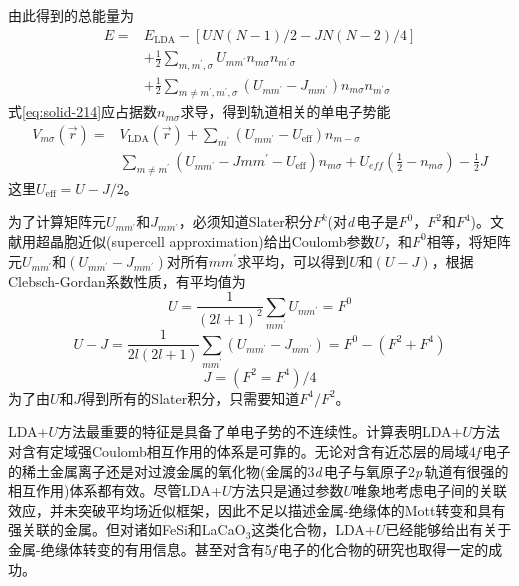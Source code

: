 由此得到的总能量为
\begin{equation}
  \begin{split}
	  E=&E_{\mathrm{LDA}}-[UN(N-1)/2-JN(N-2)/4]\\
  &+\frac12\sum_{m,m^{\prime},\sigma}U_{mm^{\prime}}n_{m\sigma}n_{m^{\prime}\sigma}\\
  &+\frac12\sum_{m\neq m^{\prime},m^{\prime},\sigma}(U_{mm^{\prime}}-J_{mm^{\prime}})n_{m\sigma}n_{m^{\prime}\sigma}
  \end{split}
  \label{eq:solid-214}
\end{equation}
式\eqref{eq:solid-214}应占据数$n_{m\sigma}$求导，得到轨道相关的单电子势能
\begin{equation}
  \begin{split}
	  V_{m\sigma}(\vec r)=&V_{\mathrm{LDA}}(\vec r)+\sum_{m^{\prime}}(U_{mm^{\prime}}-U_{\mathrm{eff}})n_{m-\sigma}\\
	  &\sum_{m\neq m^{\prime}}(U_{mm^{\prime}}-J{mm^{\prime}}-U_{\mathrm{eff}})n_{m\sigma}+U_{eff}\left(\frac12-n_{m\sigma}\right)-\frac12J
  \end{split}
  \label{eq:solid-215}
\end{equation}
这里$U_{\mathrm{eff}}=U-J/2$。

为了计算矩阵元$U_{mm^{\prime}}$和$J_{mm^{\prime}}$，必须知道Slater积分$F^k$(对{\it d}\,电子是$F^0$，$F^2$和$F^4$)。文献\cite{PRB43-7570_1991}用超晶胞近似(supercell approximation)给出Coulomb参数$U$，和$F^0$相等，将矩阵元$U_{mm^{\prime}}$和$(U_{mm^{\prime}}-J_{mm^{\prime}})$对所有$mm^{\prime}$求平均，可以得到$U$和$(U-J)$，根据Clebsch-Gordan系数性质，有平均值为
\begin{equation}
  U=\frac1{(2l+1)^2}\sum_{mm^{\prime}}U_{mm^{\prime}}=F^0
  \label{eq:solid-216}
\end{equation}
\begin{equation}
  U-J=\frac1{2l(2l+1)}\sum_{mm^{\prime}}(U_{mm^{\prime}}-J_{mm^{\prime}})=F^0-(F^2+F^4)
  \label{eq:solid-217}
\end{equation}
\begin{equation}
  J=(F^2=F^4)/4
  \label{eq:solid-218}
\end{equation}
为了由$U$和$J$得到所有的Slater积分，只需要知道$F^4/F^2$\cite{PRB42-5459_1990}。

LDA+$U$方法最重要的特征是具备了单电子势的不连续性。计算表明LDA+$U$方法对含有定域强Coulomb相互作用的体系是可靠的\cite{PRB48-16929_1993,JPCS56-1521_1995,EPL36-551_1996}。无论对含有近芯层的局域4{\textit f}\,电子的稀土金属离子还是对过渡金属的氧化物(金属的3{\textit d}\,电子与氧原子2{\textit p}\,轨道有很强的相互作用)体系都有效。尽管LDA+$U$方法只是通过参数$U$唯象地考虑电子间的关联效应，并未突破平均场近似框架，因此不足以描述金属-绝缘体的\textrm{Mott}转变和具有强关联的金属。但对诸如FeSi和LaCaO$_3$这类化合物，LDA+$U$已经能够给出有关于金属-绝缘体转变的有用信息\cite{JPCM9-767_1997}。甚至对含有5{\textit f}\,电子的化合物的研究也取得一定的成功\cite{PRB54-R3706_1996}。

